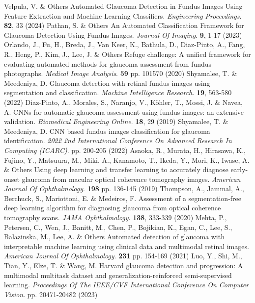 \documentclass[sn-mathphys]{sn-jnl}%
\theoremstyle{thmstyleone}%
\theoremstyle{thmstyletwo}%
\theoremstyle{thmstylethree}%
\begin{document}
\begin{thebibliography}{}
    Velpula, V. \& Others Automated Glaucoma Detection in Fundus Images Using Feature Extraction and Machine Learning Classifiers. {\em Engineering Proceedings}. \textbf{82}, 33 (2024)
    Pathan, S. \& Others An Automated Classification Framework for Glaucoma Detection Using Fundus Images. {\em Journal Of Imaging}. \textbf{9}, 1-17 (2023)
    Orlando, J., Fu, H., Breda, J., Van Keer, K., Bathula, D., Diaz-Pinto, A., Fang, R., Heng, P., Kim, J., Lee, J. \& Others Refuge challenge: A unified framework for evaluating automated methods for glaucoma assessment from fundus photographs. {\em Medical Image Analysis}. \textbf{59} pp. 101570 (2020)
    Shyamalee, T. \& Meedeniya, D. Glaucoma detection with retinal fundus images using segmentation and classification. {\em Machine Intelligence Research}. \textbf{19}, 563-580 (2022)
    Diaz-Pinto, A., Morales, S., Naranjo, V., Köhler, T., Mossi, J. \& Navea, A. CNNs for automatic glaucoma assessment using fundus images: an extensive validation. {\em Biomedical Engineering Online}. \textbf{18}, 29 (2019)
    Shyamalee, T. \& Meedeniya, D. CNN based fundus images classification for glaucoma identification. {\em 2022 2nd International Conference On Advanced Research In Computing (ICARC)}. pp. 200-205 (2022)
    Asaoka, R., Murata, H., Hirasawa, K., Fujino, Y., Matsuura, M., Miki, A., Kanamoto, T., Ikeda, Y., Mori, K., Iwase, A. \& Others Using deep learning and transfer learning to accurately diagnose early-onset glaucoma from macular optical coherence tomography images. {\em American Journal Of Ophthalmology}. \textbf{198} pp. 136-145 (2019)
    Thompson, A., Jammal, A., Berchuck, S., Mariottoni, E. \& Medeiros, F. Assessment of a segmentation-free deep learning algorithm for diagnosing glaucoma from optical coherence tomography scans. {\em JAMA Ophthalmology}. \textbf{138}, 333-339 (2020)
    Mehta, P., Petersen, C., Wen, J., Banitt, M., Chen, P., Bojikian, K., Egan, C., Lee, S., Balazinska, M., Lee, A. \& Others Automated detection of glaucoma with interpretable machine learning using clinical data and multimodal retinal images. {\em American Journal Of Ophthalmology}. \textbf{231} pp. 154-169 (2021)
    Luo, Y., Shi, M., Tian, Y., Elze, T. \& Wang, M. Harvard glaucoma detection and progression: A multimodal multitask dataset and generalization-reinforced semi-supervised learning. {\em Proceedings Of The IEEE/CVF International Conference On Computer Vision}. pp. 20471-20482 (2023)

\end{thebibliography}
\end{document}
